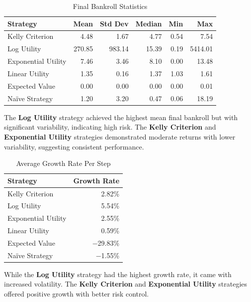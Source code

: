 \begin{table}[H]
\centering
\caption{Final Bankroll Statistics}
\label{tab:final_bankroll}
\begin{tabular}{lrrrrr}
\toprule
\textbf{Strategy} & \textbf{Mean} & \textbf{Std Dev} & \textbf{Median} & \textbf{Min} & \textbf{Max} \\
\midrule
Kelly Criterion          & 4.48   & 1.67   & 4.77   & 0.54   & 7.54   \\
Log Utility              & 270.85 & 983.14 & 15.39  & 0.19   & 5414.01 \\
Exponential Utility      & 7.46   & 3.46   & 8.10   & 0.00   & 13.48  \\
Linear Utility           & 1.35   & 0.16   & 1.37   & 1.03   & 1.61   \\
Expected Value           & 0.00   & 0.00   & 0.00   & 0.00   & 0.01   \\
Naïve Strategy           & 1.20   & 3.20   & 0.47   & 0.06   & 18.19  \\
\bottomrule
\end{tabular}
\end{table}

The \textbf{Log Utility} strategy achieved the highest mean final bankroll but with significant variability, indicating high risk. The \textbf{Kelly Criterion} and \textbf{Exponential Utility} strategies demonstrated moderate returns with lower variability, suggesting consistent performance.

\begin{table}[H]
\centering
\caption{Average Growth Rate Per Step}
\label{tab:avg_growth}
\begin{tabular}{lr}
\toprule
\textbf{Strategy} & \textbf{Growth Rate} \\
\midrule
Kelly Criterion          & 2.82\% \\
Log Utility              & 5.54\% \\
Exponential Utility      & 2.55\% \\
Linear Utility           & 0.59\% \\
Expected Value           & $-$29.83\% \\
Naïve Strategy           & $-$1.55\% \\
\bottomrule
\end{tabular}
\end{table}

While the \textbf{Log Utility} strategy had the highest growth rate, it came with increased volatility. The \textbf{Kelly Criterion} and \textbf{Exponential Utility} strategies offered positive growth with better risk control.

